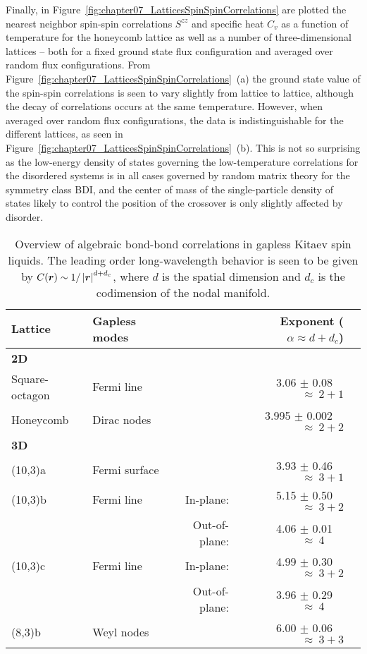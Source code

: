 Finally, in Figure~\ref{fig:chapter07_LatticesSpinSpinCorrelations} are plotted the nearest neighbor spin-spin correlations $S^{zz}$ and specific heat $C_v$ as a function of temperature for the honeycomb lattice as well as a number of three-dimensional lattices -- both for a fixed ground state flux configuration and averaged over random flux configurations.
From Figure~\ref{fig:chapter07_LatticesSpinSpinCorrelations}~(a) the ground state value of the spin-spin correlations is seen to vary slightly from lattice to lattice, although the decay of correlations occurs at the same temperature.
However, when averaged over random flux configurations, the data is indistinguishable for the different lattices, as seen in Figure~\ref{fig:chapter07_LatticesSpinSpinCorrelations}~(b).
This is not so surprising as the low-energy density of states governing the low-temperature correlations for the disordered systems is in all cases governed by random matrix theory for the symmetry class BDI, and the center of mass of the single-particle density of states likely to control the position of the crossover is only slightly affected by disorder.
%
\begin{table}[tb]
	\centering
	\label{my-label}
	\begin{tabular}{llrrr}
		\hline
		\textbf{Lattice}             & \textbf{Gapless modes}	&	& \textbf{Exponent ($\alpha \approx d + d_c$)}     	\\ \hline
		\textbf{2D}                  & 							&	&							\\
		Square-octagon				 & Fermi line 				&	& 3.06 $\pm$ 0.08~~ 			$\approx~ 2 + 1$ \\
		Honeycomb					 & Dirac nodes        		&	& 3.995 $\pm$ 0.002~~ 		$\approx~ 2 + 2$ \\
		\textbf{3D}                  & 							&	&							\\
		(10,3)a 					 & Fermi surface     		&	& 3.93 $\pm$ 0.46~~ 			$\approx~ 3 + 1$ \\
		(10,3)b						 & Fermi line        		& In-plane:		& 5.15 $\pm$ 0.50~~	 $\approx~ 3 + 2$		\\
		& 							& Out-of-plane:	& 4.06 $\pm$ 0.01~~ 	 $\approx~ 4\;\,\phantom{+ 1}$	&		\\
		(10,3)c						 & Fermi line        		& In-plane: 	& 4.99 $\pm$ 0.30~~	 $\approx~ 3 + 2$		\\
		& 							& Out-of-plane:	& 3.96 $\pm$ 0.29~~	 $\approx~ 4\;\, \phantom{+ 1}$	& 		\\
		(8,3)b 						 & Weyl nodes        		&	& 6.00 $\pm$ 0.06~~	 $\approx~ 3 + 3$ 		\\
	\end{tabular}
	\caption{
		Overview of algebraic bond-bond correlations in gapless Kitaev spin liquids.
		The leading order long-wavelength behavior is seen to be given by $C(\bm{r}) \sim 1/\left| \bm{r} \right|^{d + d_c}$, where $d$ is the spatial dimension and $d_c$ is the codimension of the nodal manifold.
	}
	\label{table:chapter07_BondBondCorrelations}
\end{table}
%
\newpage


